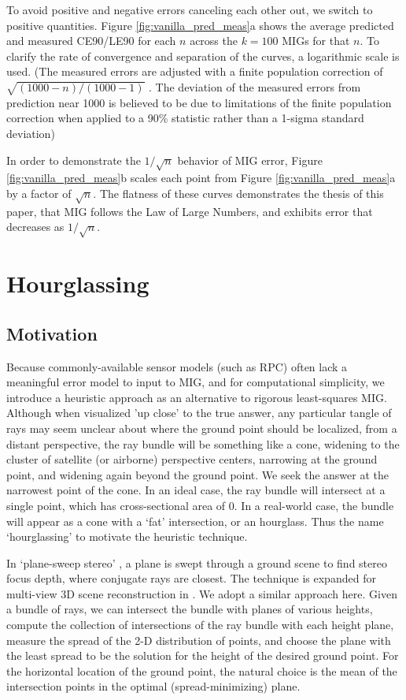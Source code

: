 \documentclass[10pt]{amsart}
\begin{document}
To avoid positive and negative errors canceling each other out, we switch to
positive quantities. Figure \ref{fig:vanilla_pred_meas}a shows the average
predicted and measured CE90/LE90 for each $n$ across the $k=100$ MIGs for that
$n$. To clarify the rate of convergence and separation of the curves, a
logarithmic scale is used. (The measured errors are adjusted with a finite
population correction of $\sqrt{(1000-n)/(1000-1)}$ \cite{FPC}. The deviation of
the measured errors from prediction near 1000 is believed to be due to
limitations of the finite population correction when applied to a 90\% statistic
rather than a 1-sigma standard deviation)

In order to demonstrate the $1/\sqrt{n}$ behavior of MIG error, Figure
\ref{fig:vanilla_pred_meas}b scales each point from Figure
\ref{fig:vanilla_pred_meas}a by a factor of $\sqrt n$. The flatness of these
curves demonstrates the thesis of this paper, that MIG follows the Law of Large
Numbers, and exhibits error that decreases as $1/\sqrt n$.




\section{Hourglassing\label{hourglassing}}
\subsection{Motivation}
Because commonly-available sensor models (such as RPC) often lack a meaningful
error model to input to MIG, and for computational simplicity, we introduce a
heuristic approach as an alternative to rigorous least-squares MIG. Although
when visualized 'up close' to the true answer, any particular tangle of rays may
seem unclear about where the ground point should be localized, from a distant
perspective, the ray bundle will be something like a cone, widening to the
cluster of satellite (or airborne) perspective centers, narrowing at the ground
point, and widening again beyond the ground point. We seek the answer at the
narrowest point of the cone. In an ideal case, the ray bundle will intersect at
a single point, which has cross-sectional area of 0. In a real-world case, the
bundle will appear as a cone with a `fat' intersection, or an hourglass. Thus
the name `hourglassing' to motivate the heuristic technique.

In `plane-sweep stereo' \cite{PLANE_SWEEP}, a plane is swept through a ground
scene to find stereo focus depth, where conjugate rays are closest. The
technique is expanded for multi-view 3D scene reconstruction in
\cite{PLANE_COLLINS}. We adopt a similar approach here. Given a bundle of rays,
we can intersect the bundle with planes of various heights, compute the
collection of intersections of the ray bundle with each height plane, measure
the spread of the 2-D distribution of points, and choose the plane with the
least spread to be the solution for the height of the desired ground point. For
the horizontal location of the ground point, the natural choice is the mean of
the intersection points in the optimal (spread-minimizing) plane.
\end{document}
